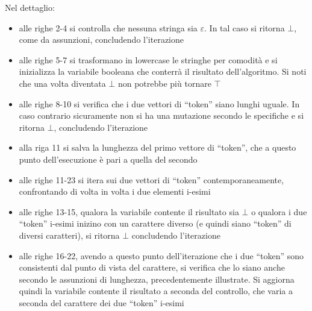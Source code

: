 \documentclass[a4paper,12pt, oneside]{book}
\begin{document}
Nel dettaglio:
\begin{itemize}
  \item alle righe 2-4 si controlla che nessuna stringa sia $\varepsilon$. In
  tal caso si ritorna $\bot$, come da assunzioni, concludendo l'iterazione
  \item alle righe 5-7 si trasformano in lowercase le stringhe per comodità e si
  inizializza la variabile booleana che conterrà il risultato dell'algoritmo. Si
  noti che una volta diventata $\bot$ non potrebbe più tornare $\top$
  \item alle righe 8-10 si verifica che i due vettori di ``token'' siano lunghi
  uguale. In caso contrario sicuramente non si ha una mutazione secondo le
  specifiche e si ritorna $\bot$, concludendo l'iterazione
  \item alla riga 11 si salva la lunghezza del primo vettore di ``token'', che a
  questo punto dell'esecuzione è pari a quella del secondo
  \item alle righe 11-23 si itera sui due vettori di ``token''
  contemporaneamente, confrontando di volta in volta i due elementi i-esimi
  \item alle righe 13-15, qualora la variabile contente il risultato sia
  $\bot$ o qualora i due ``token'' i-esimi inizino con un carattere diverso (e
  quindi siano ``token'' di diversi caratteri), si ritorna $\bot$ concludendo
  l'iterazione
  \item alle righe 16-22, avendo a questo punto dell'iterazione che i due
  ``token'' sono consistenti dal punto di vista del carattere, si verifica che
  lo siano anche secondo le assunzioni di lunghezza, precedentemente illustrate.
  Si aggiorna quindi la variabile contente il risultato a seconda del controllo,
  che varia a seconda del carattere dei due ``token'' i-esimi
\end{itemize}
\end{document}
